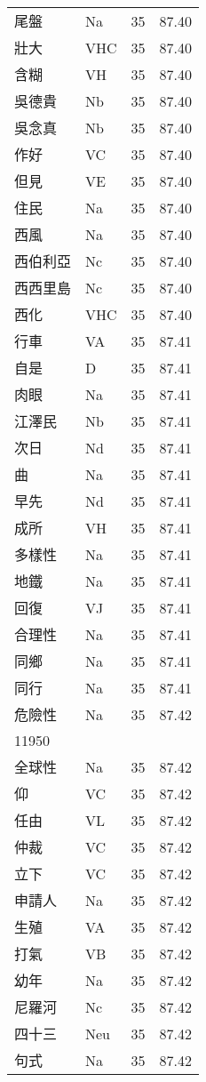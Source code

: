 \documentclass[twocolumn]{book}
\begin{document}
\begin{supertabular}{llrr}
尾盤 & Na & 35 &  87.40\\
壯大 & VHC & 35 &  87.40\\
含糊 & VH & 35 &  87.40\\
吳德貴 & Nb & 35 &  87.40\\
吳念真 & Nb & 35 &  87.40\\
作好 & VC & 35 &  87.40\\
但見 & VE & 35 &  87.40\\
住民 & Na & 35 &  87.40\\
西風 & Na & 35 &  87.40\\
西伯利亞 & Nc & 35 &  87.40\\
西西里島 & Nc & 35 &  87.40\\
西化 & VHC & 35 &  87.40\\
行車 & VA & 35 &  87.41\\
自是 & D & 35 &  87.41\\
肉眼 & Na & 35 &  87.41\\
江澤民 & Nb & 35 &  87.41\\
次日 & Nd & 35 &  87.41\\
曲 & Na & 35 &  87.41\\
早先 & Nd & 35 &  87.41\\
成所 & VH & 35 &  87.41\\
多樣性 & Na & 35 &  87.41\\
地鐵 & Na & 35 &  87.41\\
回復 & VJ & 35 &  87.41\\
合理性 & Na & 35 &  87.41\\
同鄉 & Na & 35 &  87.41\\
同行 & Na & 35 &  87.41\\
危險性 & Na & 35 &  87.42\\
11950\\
全球性 & Na & 35 &  87.42\\
仰 & VC & 35 &  87.42\\
任由 & VL & 35 &  87.42\\
仲裁 & VC & 35 &  87.42\\
立下 & VC & 35 &  87.42\\
申請人 & Na & 35 &  87.42\\
生殖 & VA & 35 &  87.42\\
打氣 & VB & 35 &  87.42\\
幼年 & Na & 35 &  87.42\\
尼羅河 & Nc & 35 &  87.42\\
四十三 & Neu & 35 &  87.42\\
句式 & Na & 35 &  87.42\\

\end{supertabular}
\end{document}
